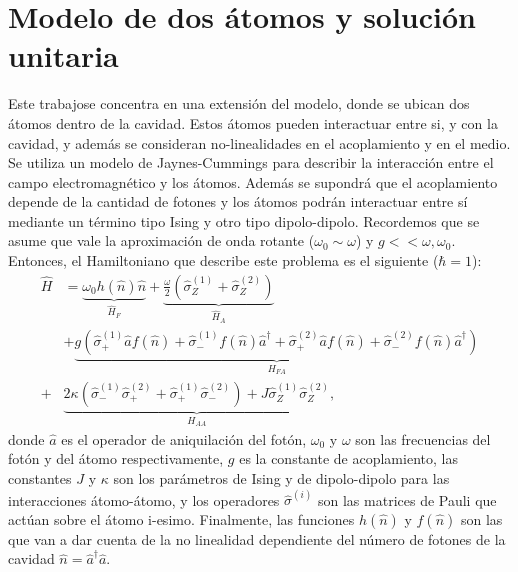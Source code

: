 


\section{Modelo de dos átomos y solución unitaria}
Este trabajose concentra en una extensión del modelo, donde se ubican dos átomos dentro de la cavidad. Estos átomos pueden interactuar entre si, y con la cavidad, y además se consideran no-linealidades en el acoplamiento y en el medio.
Se utiliza un modelo de Jaynes-Cummings para describir la interacci\'on entre el campo electromagn\'etico y los átomos. Adem\'as se supondrá que el acoplamiento depende de la cantidad de fotones y los átomos podr\'an interactuar entre sí mediante un término tipo Ising y otro tipo dipolo-dipolo. Recordemos que se asume que vale la aproximaci\'on de onda rotante ($\omega_0 \sim \omega$) y $g << \omega,\omega_0$.
Entonces, el Hamiltoniano que describe este problema es el siguiente ($\hbar=1$):
\begin{equation}
\begin{split}
     \hat H & =\underbrace{ \omega_0 h(\hat n) \hat n }_{\hat H_F}+\underbrace{\frac{ \omega}{2}(\hat\sigma_Z^{(1)}+\hat\sigma_Z^{(2)})}_{\hat H_A}   \\ 
     & + \underbrace{ g(\hat\sigma_+^{(1)}\hat a f(\hat n)+\hat\sigma_-^{(1)}f(\hat n) \hat a^\dagger + \hat\sigma_+^{(2)}\hat a f(\hat n)+\hat\sigma_-^{(2)}f(\hat n) \hat a^\dagger)}_{H_{FA}} \\ +& \underbrace{2 \kappa (\hat \sigma_-^{(1)}\hat \sigma_+^{(2)}+\hat \sigma_+^{(1)}\hat \sigma_-^{(2)}) +  J \hat \sigma_Z^{(1)}\hat \sigma_Z^{(2)}}_{H_{AA}},
\end{split}
\end{equation}
donde $\hat a$ es el operador de aniquilaci\'on del fot\'on, $\omega_0$ y $\omega$ son las frecuencias del fot\'on y del átomo respectivamente, $g$ es la constante de acoplamiento, las constantes $J$ y $\kappa$ son los par\'ametros de Ising y de dipolo-dipolo para las interacciones átomo-átomo, y los operadores $\hat \sigma^{(i)}$ son las matrices de Pauli que act\'uan sobre el átomo i-esimo. Finalmente, las funciones $h(\hat n)$ y $f(\hat n)$ son las que van a dar cuenta de la no linealidad dependiente del número de fotones de la cavidad $\hat n = \hat a^\dagger \hat a$. 

